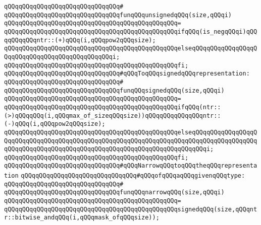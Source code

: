 \verb|qQQqqQQqqQQqqQQqqQQqqQQqqQQqqQQq#|\newline
\verb|qQQqqQQqqQQqqQQqqQQqqQQqqQQqqQQqfunqQQqunsignedqQQq(size,qQQqi)|\newline
\verb|qQQqqQQqqQQqqQQqqQQqqQQqqQQqqQQqqQQqqQQqqQQqqQQq=|\newline
\verb|qQQqqQQqqQQqqQQqqQQqqQQqqQQqqQQqqQQqqQQqqQQqqQQqifqQQq(is_negqQQqi)qQQqqQQqqQQqntr::(+)qQQq(i,qQQqpow2qQQqsize);|\newline
\verb|qQQqqQQqqQQqqQQqqQQqqQQqqQQqqQQqqQQqqQQqqQQqqQQqelseqQQqqQQqqQQqqQQqqQQqqQQqqQQqqQQqqQQqqQQqqQQqqQQqi;|\newline
\verb|qQQqqQQqqQQqqQQqqQQqqQQqqQQqqQQqqQQqqQQqqQQqqQQqfi;|\newline
\newline
\verb|qQQqqQQqqQQqqQQqqQQqqQQqqQQqqQQq#qQQqToqQQqsignedqQQqrepresentation:|\newline
\verb|qQQqqQQqqQQqqQQqqQQqqQQqqQQqqQQq#|\newline
\verb|qQQqqQQqqQQqqQQqqQQqqQQqqQQqqQQqfunqQQqsignedqQQq(size,qQQqi)|\newline
\verb|qQQqqQQqqQQqqQQqqQQqqQQqqQQqqQQqqQQqqQQqqQQqqQQq=|\newline
\verb|qQQqqQQqqQQqqQQqqQQqqQQqqQQqqQQqqQQqqQQqqQQqqQQqifqQQq(ntr::(>)qQQqqQQq(i,qQQqmax_of_sizeqQQqsize))qQQqqQQqqQQqqQQqntr::(-)qQQq(i,qQQqpow2qQQqsize);|\newline
\verb|qQQqqQQqqQQqqQQqqQQqqQQqqQQqqQQqqQQqqQQqqQQqqQQqelseqQQqqQQqqQQqqQQqqQQqqQQqqQQqqQQqqQQqqQQqqQQqqQQqqQQqqQQqqQQqqQQqqQQqqQQqqQQqqQQqqQQqqQQqqQQqqQQqqQQqqQQqqQQqqQQqqQQqqQQqqQQqqQQqqQQqqQQqqQQqqQQqi;|\newline
\verb|qQQqqQQqqQQqqQQqqQQqqQQqqQQqqQQqqQQqqQQqqQQqqQQqfi;|\newline
\newline
\verb|qQQqqQQqqQQqqQQqqQQqqQQqqQQqqQQq#qQQqNarrowqQQqtoqQQqtheqQQqrepresentation|\newline
\verb|qQQqqQQqqQQqqQQqqQQqqQQqqQQqqQQq#qQQqofqQQqaqQQqgivenqQQqtype:|\newline
\verb|qQQqqQQqqQQqqQQqqQQqqQQqqQQqqQQq#|\newline
\verb|qQQqqQQqqQQqqQQqqQQqqQQqqQQqqQQqfunqQQqnarrowqQQq(size,qQQqi)|\newline
\verb|qQQqqQQqqQQqqQQqqQQqqQQqqQQqqQQqqQQqqQQqqQQqqQQq=|\newline
\verb|qQQqqQQqqQQqqQQqqQQqqQQqqQQqqQQqqQQqqQQqqQQqqQQqsignedqQQq(size,qQQqntr::bitwise_andqQQq(i,qQQqmask_ofqQQqsize));|\newline
\newline
